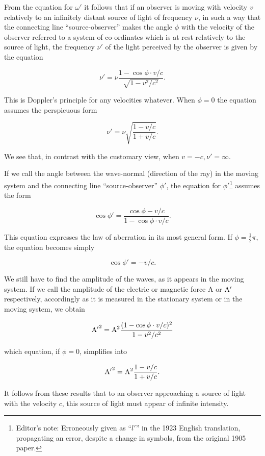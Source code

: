 \documentclass{article}
\newcommand{\pr}[1]{${\rm #1}'$}
\newcounter{fnsave}
\newcommand{\edNoteBegin}{
\renewcommand{\thefootnote}{\fnsymbol{footnote}}
\setcounter{fnsave}{\value{footnote}}
\setcounter{footnote}{1}
}
\newcommand{\edNoteEnd}{
\renewcommand{\thefootnote}{\arabic{footnote}}
\setcounter{footnote}{\value{fnsave}}
}
\begin{document}
From the equation for $\omega'$ it follows that if an observer is moving with
velocity $v$ relatively to an infinitely distant source of light of
frequency $\nu$, in such a way that the connecting line ``source-observer''
makes the angle $\phi$ with the velocity of the observer referred to a
system of co-ordinates which is at rest relatively to the source of
light, the frequency $\nu'$ of the light perceived by the observer is
given by the equation

\[
\nu' = \nu\frac{1-\cos\phi\cdot v/c}{\sqrt{1-v^2/c^2}}.
\]

\noindent
This is Doppler's principle for any velocities whatever.  When $\phi=0$
the equation assumes the perspicuous form

\[
\nu'=\nu\sqrt{\frac{1-v/c}{1+v/c}}.
\]

\noindent
We see that, in contrast with the customary view, when
$v=-c, \nu'=\infty$.

\edNoteBegin
If we call the angle between the wave-normal (direction of the ray) in
the moving system and the connecting line ``source-observer'' $\phi'$, the
equation for $\phi'$\footnote{
    {\sf Editor's note:  Erroneously given as ``$l'$'' in the 1923 English
    translation, propagating an error, despite a change in symbols, from
    the original 1905 paper.}
}
assumes the form
\edNoteEnd

\[
\cos\phi'=\frac{\cos\phi-v/c}{1-\cos\phi\cdot v/c}.
\]

\noindent
This equation expresses the law of aberration in its most general
form.  If $\phi=\frac{1}{2}\pi$, the equation becomes simply

\[
\cos\phi'=-v/c.
\]


We still have to find the amplitude of the waves, as it appears in the
moving system.  If we call the amplitude of the electric or magnetic
force A or \pr{A} respectively, accordingly as it is measured in the
stationary system or in the moving system, we obtain

\[
{\rm A'}^2={\rm A}^2\frac{(1-\cos\phi\cdot v/c)^2}{1-v^2/c^2}
\]

\noindent
which equation, if $\phi=0$, simplifies into

\[
{\rm A'}^2={\rm A}^2\frac{1-v/c}{1+v/c}.
\]

It follows from these results that to an observer approaching a source
of light with the velocity $c$, this source of light must appear of
infinite intensity.

\end{document}
